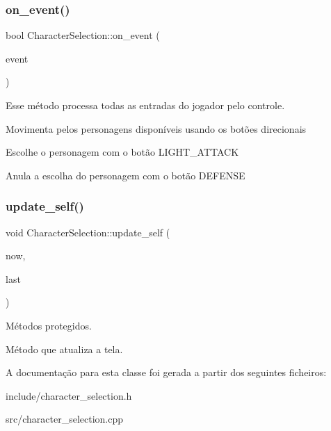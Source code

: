 \subsubsection{\texorpdfstring{on\+\_\+event()}{on\_event()}}
{\footnotesize\ttfamily bool Character\+Selection\+::on\+\_\+event (\begin{DoxyParamCaption}\item[{const Game\+Event \&}]{event }\end{DoxyParamCaption})\hspace{0.3cm}{\ttfamily [protected]}}



Esse método processa todas as entradas do jogador pelo controle. 

Movimenta pelos personagens disponíveis usando os botões direcionais

Escolhe o personagem com o botão \textquotesingle{}L\+I\+G\+H\+T\+\_\+\+A\+T\+T\+A\+CK\textquotesingle{}

Anula a escolha do personagem com o botão \textquotesingle{}D\+E\+F\+E\+N\+SE\textquotesingle{} \mbox{\label{classCharacterSelection_ae398845f5f793f40ddf8314a0ad16f7e}} 
\subsubsection{\texorpdfstring{update\+\_\+self()}{update\_self()}}
{\footnotesize\ttfamily void Character\+Selection\+::update\+\_\+self (\begin{DoxyParamCaption}\item[{unsigned}]{now,  }\item[{unsigned}]{last }\end{DoxyParamCaption})\hspace{0.3cm}{\ttfamily [protected]}}



Métodos protegidos. 

Método que atualiza a tela. 

A documentação para esta classe foi gerada a partir dos seguintes ficheiros\+:\begin{DoxyCompactItemize}
\item 
include/character\+\_\+selection.\+h\item 
src/character\+\_\+selection.\+cpp\end{DoxyCompactItemize}
